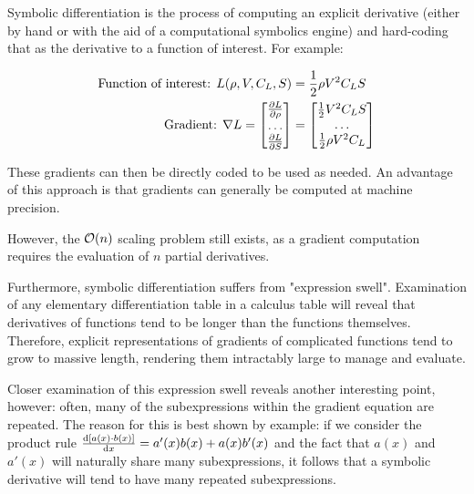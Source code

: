 Symbolic differentiation is the process of computing an explicit derivative (either by hand or with the aid of a computational symbolics engine) and hard-coding that as the derivative to a function of interest. For example:

\begin{equation}
    \begin{split}
        \text{Function of interest: } L(\rho, V, C_L, S) &= \frac{1}{2} \rho V^2 C_L S \\
        \text{Gradient: } \nabla L = \begin{bmatrix}
                                         \frac{\partial L}{\partial \rho} \\
                                         \dots \\
                                         \frac{\partial L}{\partial S}\\
        \end{bmatrix} &= \begin{bmatrix}
                             \frac{1}{2} V^2 C_L S \\
                             \dots \\
                             \frac{1}{2} \rho V^2 C_L \\
        \end{bmatrix}\\
    \end{split}
\end{equation}

These gradients can then be directly coded to be used as needed. An advantage of this approach is that gradients can generally be computed at machine precision.

However, the $\mathcal{O}(n)$ scaling problem still exists, as a gradient computation requires the evaluation of $n$ partial derivatives.

Furthermore, symbolic differentiation suffers from "expression swell". Examination of any elementary differentiation table in a calculus table will reveal that derivatives of functions tend to be longer than the functions themselves. Therefore, explicit representations of gradients of complicated functions tend to grow to massive length, rendering them intractably large to manage and evaluate.

Closer examination of this expression swell reveals another interesting point, however: often, many of the subexpressions within the gradient equation are repeated. The reason for this is best shown by example: if we consider the product rule $\frac{\mathrm{d} [a(x) \cdot b(x)]}{\mathrm{d} x} = a'(x) b(x) + a(x) b'(x)$ and the fact that $a(x)$ and $a'(x)$ will naturally share many subexpressions, it follows that a symbolic derivative will tend to have many repeated subexpressions.

